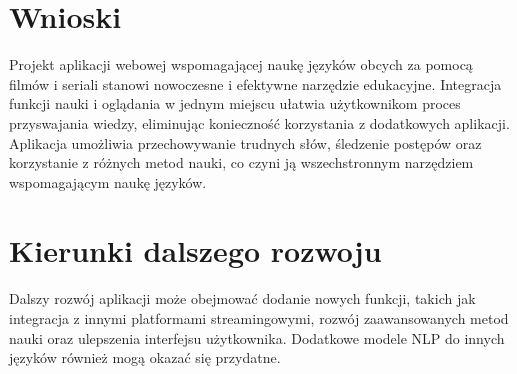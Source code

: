 
\section{Wnioski}
Projekt aplikacji webowej wspomagającej naukę języków obcych za pomocą filmów i seriali stanowi nowoczesne i efektywne narzędzie edukacyjne. Integracja funkcji nauki i oglądania w jednym miejscu ułatwia użytkownikom proces przyswajania wiedzy, eliminując konieczność korzystania z dodatkowych aplikacji. Aplikacja umożliwia przechowywanie trudnych słów, śledzenie postępów oraz korzystanie z różnych metod nauki, co czyni ją wszechstronnym narzędziem wspomagającym naukę języków.
\section{Kierunki dalszego rozwoju}
Dalszy rozwój aplikacji może obejmować dodanie nowych funkcji, takich jak integracja z innymi platformami streamingowymi, rozwój zaawansowanych metod nauki oraz ulepszenia interfejsu użytkownika. Dodatkowe modele NLP do innych języków również mogą okazać się przydatne.